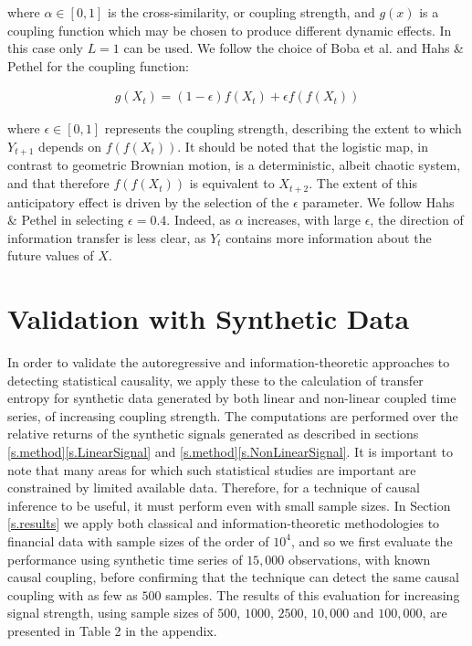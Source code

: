 \documentclass[]{rsos}%
\begin{document}
  where $ \alpha \in [0,1]$ is the cross-similarity, or coupling strength, and $g(x)$ is a coupling function which may be chosen to produce different dynamic effects. In this case only $L=1$ can be used. We follow the choice of Boba et al. \cite{boba2015efficient} and Hahs \& Pethel \cite{hahs2011distinguishing} for the coupling function:

  \begin{eqnarray}
    g(X_t) = (1-\epsilon) f(X_t) + \epsilon f(f(X_t)) 
    \label{eq:g(x)}
  \end{eqnarray}


 where $\epsilon \in [0,1]$ represents the coupling strength, describing the extent to which $Y_{t+1}$ depends on $f(f(X_t))$. It should be noted that the logistic map, in contrast to geometric Brownian motion, is a deterministic, albeit chaotic system, and that therefore $f(f(X_t))$ is equivalent to $X_{t+2}$. {\color{black} The extent of this anticipatory effect is driven by the selection of the $\epsilon$ parameter. We follow Hahs \& Pethel in selecting $\epsilon=0.4$. Indeed, as $\alpha$ increases, with large $\epsilon$, the direction of information transfer is less clear, as $Y_t$ contains more information about the future values of $X$. }



\section{Validation with Synthetic Data} \label{s.validation}

  In order to validate the autoregressive and information-theoretic approaches to detecting {\color{blue}statistical} causality, we apply these to the calculation of transfer entropy for synthetic data generated by both linear and non-linear coupled time series, of increasing coupling strength. 
  The computations are performed over the relative returns of the synthetic signals generated as described in sections \ref{s.method}\ref{s.LinearSignal} and \ref{s.method}\ref{s.NonLinearSignal}. 
  It is important to note that many areas for which such statistical studies are important are constrained by limited available data. Therefore, for a technique of causal inference to be useful, it must perform even with small sample sizes. In Section \ref{s.results} we apply both classical and information-theoretic methodologies to financial data with sample sizes of the order of $10^4$, and so we first evaluate the performance using synthetic time series of $15,000$ observations, with known causal coupling, before confirming that the technique can detect the same causal coupling with as few as $500$ samples. The results of this evaluation for increasing signal strength, using sample sizes of $500$, $1000$, $2500$, $10,000$ and $100,000$, are presented in Table {\color{blue}2} in the appendix.
\end{document}
